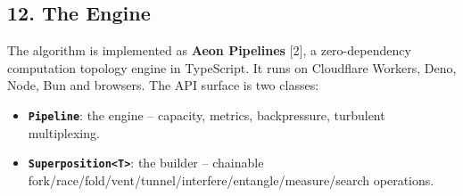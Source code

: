 \documentclass[
  11pt,
]{article}
\begin{document}
\subsection{12. The Engine}\label{the-engine}

The algorithm is implemented as \textbf{Aeon Pipelines} {[}2{]}, a
zero-dependency computation topology engine in TypeScript. It runs on
Cloudflare Workers, Deno, Node, Bun and browsers. The API surface is two
classes:

\begin{itemize}
\item
  \textbf{\texttt{Pipeline}}: the engine -- capacity, metrics,
  backpressure, turbulent multiplexing.
\item
  \textbf{\texttt{Superposition\textless{}T\textgreater{}}}: the builder
  -- chainable
  fork/race/fold/vent/tunnel/interfere/entangle/measure/search
  operations.
\end{itemize}
\end{document}
